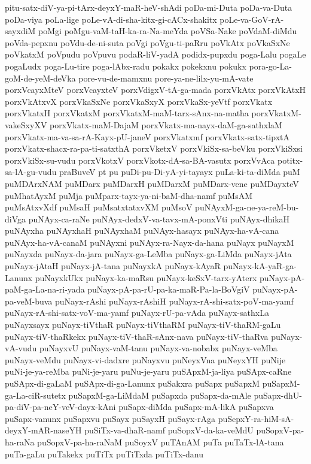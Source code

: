 {pitu-satx-diV-ya-pi-tArx-deyxY-maR-heV-shAdi
poDa-mi-Duta
poDa-va-Duta
poDa-viya
poLa-lige
poLe-vA-di-sha-kitx-gi-cACx-shakitx
poLe-va-GoV-rA-sayxdiM
poMgi
poMgu-vaM-taH-ka-ra-Na-meYda
poVSa-Nake
poVdaM-diMdu
poVda-pepxnu
poVdu-de-ni-suta
poVgi
poVgu-ti-paRru
poVkAtx
poVkaSxNe
poVkatxM
poVpudu
poVpuvu
podaR-liV-yadA
podidx-pupxdu
poga-Lalu
pogaLe
pogaLudx
poga-Lu-tire
poga-lAbx-radu
pokakx
pokekxnu
pokukx
pora-go-La-goM-de-yeM-deVka
pore-vu-de-mamxnu
pore-ya-ne-lilx-yu-mA-vate
porxVcayxMteV
porxVcayxteV
porxVdigxV-tA-ga-mada
porxVkAtx
porxVkAtxH
porxVkAtxvX
porxVkaSxNe
porxVkaSxyX
porxVkaSx-yeVtf
porxVkatx
porxVkatxH
porxVkatxM
porxVkatxM-maM-tarx-sAnx-na-matha
porxVkatxM-vakeSxyXV
porxVkatx-maM-DajaM
porxVkatx-ma-nayx-daM-ga-sathxlaM
porxVkatx-ma-va-sa-rA-Kayx-pU-janeV
porxVkatxmf
porxVkatx-satx-tipxtA
porxVkatx-shacx-ra-pa-ti-satxthA
porxVketxV
porxVkiSx-sa-beVku
porxVkiSxsi
porxVkiSx-su-vudu
porxVkotxV
porxVkotx-dA-sa-BA-vasutx
porxVvAca
potitx-sa-lA-gu-vudu
praBuveV
pt
pu
puDi-pu-Di-yA-yi-tayayx
puLa-ki-ta-diMda
puM
puMDArxNAM
puMDarx
puMDarxH
puMDarxM
puMDarx-vene
puMDayxteV
puMhatAyxM
puMja
puMparx-tayx-ya-ni-baM-dha-namf
puMsAM
puMsAtxvXdf
puMsaH
puMsatxtatxvXM
puMsoV
puNAyxM-ga-ne-ya-reM-bu-diVga
puNAyx-ca-raNe
puNAyx-dedxV-va-tavx-mA-ponxVti
puNAyx-dhikaH
puNAyxha
puNAyxhaH
puNAyxhaM
puNAyx-hasayx
puNAyx-ha-vA-cana
puNAyx-ha-vA-canaM
puNAyxni
puNAyx-ra-Nayx-da-hana
puNayx
puNayxM
puNayxda
puNayx-da-jara
puNayx-ga-LeMba
puNayx-ga-LiMda
puNayx-jAta
puNayx-jAtaH
puNayx-jA-tana
puNayxkA
puNayx-kAyaR
puNayx-kA-yaR-ga-Lanunx
puNayxkUkx
puNayx-ka-maRsu
puNayx-keSxV-tarx-yAterx
puNayx-pA-paM-ga-La-na-ri-yada
puNayx-pA-pa-rU-pa-ka-maR-Pa-la-BoVgiV
puNayx-pA-pa-veM-buva
puNayx-rAshi
puNayx-rAshiH
puNayx-rA-shi-satx-poV-ma-yamf
puNayx-rA-shi-satx-voV-ma-yamf
puNayx-rU-pa-vAda
puNayx-sathxLa
puNayxsayx
puNayx-tiVthaR
puNayx-tiVthaRM
puNayx-tiV-thaRM-gaLu
puNayx-tiV-thaRkekx
puNayx-tiV-thaR-sAnx-nava
puNayx-tiV-thaRva
puNayx-vA-vudu
puNayxvU
puNayx-vaM-tanu
puNayx-va-nobabx
puNayx-veMba
puNayx-veMdu
puNayx-vi-dadxre
puNayxvu
puNeyxVna
puNeyxYH
puNije
puNi-je-ya-reMba
puNi-je-yaru
puNu-je-yaru
puSApxM-ja-liya
puSApx-caRne
puSApx-di-gaLaM
puSApx-di-ga-Lanunx
puSakxra
puSapx
puSapxM
puSapxM-ga-La-ciR-sutetx
puSapxM-ga-LiMdaM
puSapxda
puSapx-da-mAle
puSapx-dhU-pa-diV-pa-neY-veV-dayx-kAni
puSapx-diMda
puSapx-mA-likA
puSapxva
puSapx-vanunx
puSapxvu
puSayx
puSayxH
puSayx-rAga
puSepxY-ra-hiM-sA-deyxY-mAR-naseYH
puSiTx-va-dhaR-namf
puSopxV-da-ka-veMdU
puSopxV-pa-ha-raNa
puSopxV-pa-ha-raNaM
puSoyxV
puTAnAM
puTa
puTaTx-lA-tana
puTa-gaLu
puTakekx
puTiTx
puTiTxda
puTiTx-danu
}
